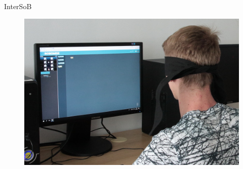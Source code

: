 \documentclass[
]{beamer}
\begin{document}
\begin{frame}{InterSoB}
\begin{figure}
\includegraphics[width=\textwidth,height=.75\textheight,keepaspectratio]{../img/intersob}
\end{figure}
\end{frame}
\end{document}

